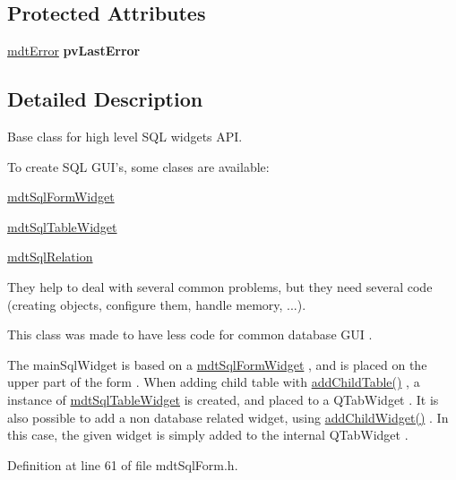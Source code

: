 \subsection*{Protected Attributes}
\begin{DoxyCompactItemize}
\item 
\hypertarget{classmdt_sql_form_afc24e8dedd1249a29708347fdff560fd}{
\hyperlink{classmdt_error}{mdtError} {\bfseries pvLastError}}
\label{classmdt_sql_form_afc24e8dedd1249a29708347fdff560fd}

\end{DoxyCompactItemize}


\subsection{Detailed Description}
Base class for high level SQL widgets API. 

To create SQL GUI's, some clases are available:
\begin{DoxyItemize}
\item \hyperlink{classmdt_sql_form_widget}{mdtSqlFormWidget}
\item \hyperlink{classmdt_sql_table_widget}{mdtSqlTableWidget}
\item \hyperlink{classmdt_sql_relation}{mdtSqlRelation}
\end{DoxyItemize}

They help to deal with several common problems, but they need several code (creating objects, configure them, handle memory, ...).

This class was made to have less code for common database GUI .

The mainSqlWidget is based on a \hyperlink{classmdt_sql_form_widget}{mdtSqlFormWidget} , and is placed on the upper part of the form . When adding child table with \hyperlink{classmdt_sql_form_a3504a54f26777ed38efce5cc151a1dbf}{addChildTable()} , a instance of \hyperlink{classmdt_sql_table_widget}{mdtSqlTableWidget} is created, and placed to a QTabWidget . It is also possible to add a non database related widget, using \hyperlink{classmdt_sql_form_a86174e002c2dd5496ab74a7eb67c614c}{addChildWidget()} . In this case, the given widget is simply added to the internal QTabWidget . 

Definition at line 61 of file mdtSqlForm.h.



